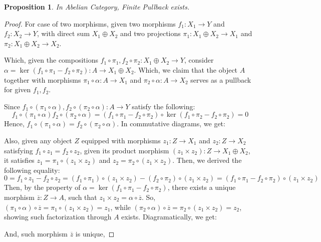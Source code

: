 \documentclass[x11names,reqno,12pt]{extarticle}
\newtheorem{prop}{Proposition}
\begin{document}
\begin{prop}
    In Abelian Category, Finite Pullback exists.
\end{prop}
\begin{proof}
    For case of two morphisms, given two morphisms $f_1:X_1\rightarrow Y$ and $f_2:X_2\rightarrow Y$, with direct sum $X_1\oplus X_2$ and two projections $\pi_1:X_1\oplus X_2\rightarrow X_1$ and $\pi_2:X_1\oplus X_2\rightarrow X_2$.

    Which, given the compositions $f_1\circ \pi_1, f_2\circ\pi_2:X_1\oplus X_2\rightarrow Y$, consider $\alpha = \ker(f_1\circ \pi_1-f_2\circ\pi_2): A\rightarrow X_1\oplus X_2$. Which, we claim that the object $A$ together with morphisms $\pi_1\circ \alpha:A\rightarrow X_1$ and $\pi_2\circ \alpha:A\rightarrow X_2$ serves as a pullback for given $f_1,f_2$.

    \hfil

    Since $f_1\circ (\pi_1\circ\alpha), f_2\circ (\pi_2\circ\alpha):A\rightarrow Y$ satisfy the following:
    $$f_1\circ (\pi_1\circ\alpha)f_2\circ (\pi_2\circ\alpha) = (f_1\circ\pi_1-f_2\circ\pi_2)\circ \ker(f_1\circ\pi_2-f_2\circ\pi_2) = 0$$
    Hence, $f_1\circ (\pi_1\circ \alpha)=f_2\circ(\pi_2\circ \alpha)$. In commutative diagrams, we get:
    \begin{center}
    \end{center}
    Also, given any object $Z$ equipped with morphisms $z_1:Z\rightarrow X_1$ and $z_2:Z\rightarrow X_2$ satisfying $f_1\circ z_1=f_2\circ z_2$, given its product morphism $(z_1\times z_2):Z\rightarrow X_1\oplus X_2$, it satisfies $z_1=\pi_1\circ(z_1\times z_2)$ and $z_2=\pi_2\circ(z_1\times z_2)$. Then, we derived the following equality:
    $$0=f_1\circ z_1-f_2\circ z_2=(f_1\circ\pi_1)\circ (z_1\times z_2)-(f_2\circ\pi_2)\circ (z_1\times z_2) = (f_1\circ\pi_1-f_2\circ\pi_2)\circ (z_1\times z_2)$$
    Then, by the property of $\alpha=\ker(f_1\circ\pi_1-f_2\circ\pi_2)$, there exists a unique morphism $\overline{z}:Z\rightarrow A$, such that $z_1\times z_2=\alpha\circ \overline{z}$. So, $(\pi_1\circ\alpha)\circ \overline{z} = \pi_1\circ (z_1\times z_2)=z_1$, while $(\pi_2\circ\alpha)\circ \overline{z}=\pi_2\circ(z_1\times z_2)=z_2$, showing such factorization through $A$ exists. Diagramatically, we get:
    \begin{center}
    \end{center}
    And, such morphism $\overline{z}$ is unique, 
\end{proof}
\end{document}
